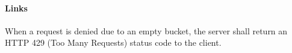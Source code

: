 \label{SR-401}
\paragraph{Links} 

When a request is denied due to an empty bucket,
the server shall return an HTTP 429 (Too Many Requests) status code to the client.